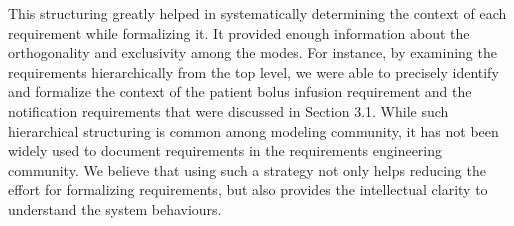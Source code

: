 This structuring greatly helped in systematically determining the context of each requirement while formalizing it. It provided enough information about the orthogonality and exclusivity among the modes. For instance, by examining the requirements hierarchically from the top level, we were able to precisely identify and formalize the context of the patient bolus infusion requirement and the notification requirements that were discussed in Section 3.1. While such hierarchical structuring is common among modeling community, it has not been widely used to document requirements in the requirements engineering community. We believe that using such a strategy not only helps reducing the effort for formalizing requirements, but also provides the intellectual clarity to understand the system behaviours.

